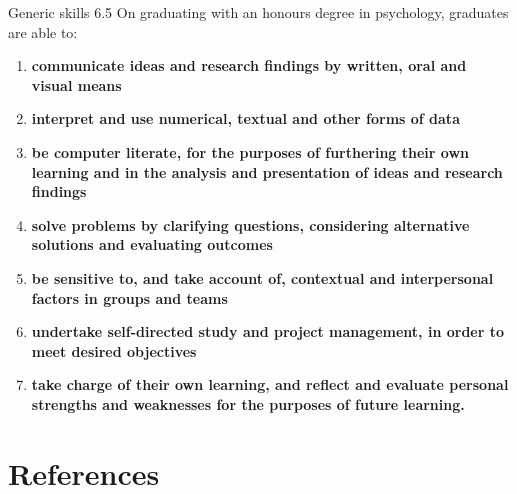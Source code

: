 \documentclass[
  11pt,
  letterpaper,
  oneside,
  open=any]{scrbook}
\begin{document}
Generic skills 6.5 On graduating with an honours degree in psychology,
graduates are able to:

\begin{enumerate}
\def\labelenumi{\arabic{enumi}.}
\item
  \textbf{communicate ideas and research findings by written, oral and
  visual means}
\item
  \textbf{interpret and use numerical, textual and other forms of data}
\item
  \textbf{be computer literate, for the purposes of furthering their own
  learning and in the analysis and presentation of ideas and research
  findings}
\item
  \textbf{solve problems by clarifying questions, considering
  alternative solutions and evaluating outcomes}
\item
  \textbf{be sensitive to, and take account of, contextual and
  interpersonal factors in groups and teams}
\item
  \textbf{undertake self-directed study and project management, in order
  to meet desired objectives}
\item
  \textbf{take charge of their own learning, and reflect and evaluate
  personal strengths and weaknesses for the purposes of future
  learning.}\\
\end{enumerate}

\hypertarget{references}{%
\section{References}\label{references}}


\backmatter
\end{document}
